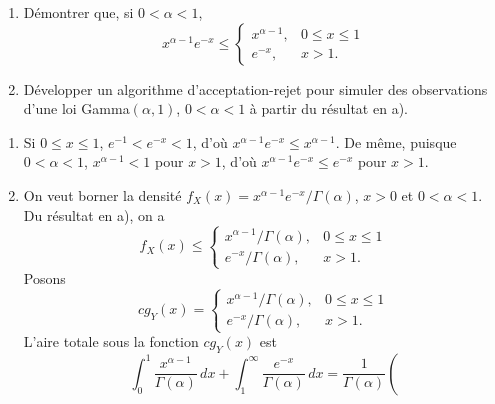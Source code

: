 \begin{exercice}
  \begin{enumerate}
  \item Démontrer que, si $0 < \alpha < 1$,
    \begin{displaymath}
      x^{\alpha - 1} e^{-x} \leq
      \begin{cases}
        x^{\alpha - 1}, & 0 \leq x \leq 1 \\
        e^{-x},        & x > 1.
      \end{cases}
    \end{displaymath}
  \item Développer un algorithme d'acceptation-rejet pour simuler des
    observations d'une loi Gamma$(\alpha, 1)$, $0 < \alpha < 1$ à
    partir du résultat en a).
  \end{enumerate}
  \begin{sol}
    \begin{enumerate}
    \item Si $0 \leq x \leq 1$, $e^{-1} < e^{-x} < 1$, d'où $x^{\alpha
        - 1} e^{-x} \leq x^{\alpha - 1}$. De même, puisque $0 < \alpha
      < 1$, $x^{\alpha - 1} < 1$ pour $x > 1$, d'où  $x^{\alpha - 1}
      e^{-x} \leq e^{-x}$ pour $x > 1$.
    \item On veut borner la densité $f_X(x) = x^{\alpha - 1}
      e^{-x}/\Gamma(\alpha)$, $x > 0$ et $0 < \alpha < 1$. Du résultat
      en a), on a
      \begin{displaymath}
        f_X(x) \leq
        \begin{cases}
          x^{\alpha - 1}/\Gamma(\alpha), & 0 \leq x \leq 1 \\
          e^{-x}/\Gamma(\alpha),        & x > 1.
        \end{cases}
      \end{displaymath}
      Posons
      \begin{displaymath}
        c g_Y(x) =
        \begin{cases}
          x^{\alpha - 1}/\Gamma(\alpha), & 0 \leq x \leq 1 \\
          e^{-x}/\Gamma(\alpha),        & x > 1.
        \end{cases}
      \end{displaymath}
      L'aire totale sous la fonction $c g_Y(x)$ est
      \begin{displaymath}
        \int_0^1 \frac{x^{\alpha - 1}}{\Gamma(\alpha)}\, dx +
        \int_1^\infty \frac{e^{-x}}{\Gamma(\alpha)}\, dx =
        \frac{1}{\Gamma(\alpha)}
        \left(

\end{displaymath}
\end{enumerate}
\end{sol}
\end{exercice}
